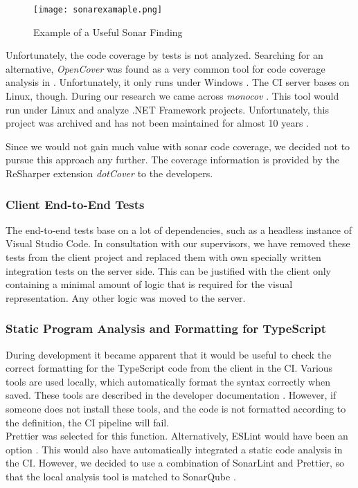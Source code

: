\begin{figure}[H]
    \centering
    \texttt{[image: sonarexamaple.png]}
    \caption{Example of a Useful Sonar Finding}
    \label{fig:sonarexample}
\end{figure}

Unfortunately, the code coverage by tests is not analyzed.
Searching for an alternative, \textit{OpenCover} was found as a very common tool for code coverage analysis in \Csharp.
Unfortunately, it only runs under Windows  \cite{opencover}.
The CI server bases on Linux, though.
During our research we came across \textit{monocov} \cite{monocov}.
This tool would run under Linux and analyze .NET Framework projects.
Unfortunately, this project was archived and has not been maintained for almost 10 years \cite{monocov}.

Since we would not gain much value with sonar code coverage, we decided not to pursue this approach any further.
The coverage information is provided by the ReSharper extension \textit{dotCover} \cite{dotcover} to the developers.

\subsubsection{Client End-to-End Tests}
The end-to-end tests base on a lot of dependencies, such as a headless instance of Visual Studio Code.
In consultation with our supervisors, we have removed these tests from the client project and replaced them with own specially written integration tests on the server side.
This can be justified with the client only containing a minimal amount of logic that is required for the visual representation.
Any other logic was moved to the server.

\subsubsection{Static Program Analysis and Formatting for TypeScript}
During development it became apparent that it would be useful to check the correct formatting
for the TypeScript code from the client in the CI.
Various tools are used locally, which automatically format the syntax correctly when saved.
These tools are described in the developer documentation \cite{dev}.
However, if someone does not install these tools,
and the code is not formatted according to the definition,
the CI pipeline will fail. \\

Prettier was selected for this function.
Alternatively, ESLint would have been an option \cite{eslint}.
This would also have automatically integrated a static code analysis in the CI.
However, we decided to use a combination of SonarLint and Prettier,
so that the local analysis tool is matched to SonarQube \cite{dev}.

